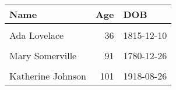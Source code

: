 \begin{table}[H]
\centering
\begin{tabular}{lrl}
\toprule
Name & Age & DOB\\
\midrule
\cellcolor{gray!6}{Charles Babbage} & \cellcolor{gray!6}{79} & \cellcolor{gray!6}{1791-12-26}\\
Ada Lovelace & 36 & 1815-12-10\\
\cellcolor{gray!6}{Alan Turing} & \cellcolor{gray!6}{41} & \cellcolor{gray!6}{1912-06-23}\\
Mary Somerville & 91 & 1780-12-26\\
\cellcolor{gray!6}{John Conway} & \cellcolor{gray!6}{82} & \cellcolor{gray!6}{1937-12-26}\\
\addlinespace
Katherine Johnson & 101 & 1918-08-26\\
\bottomrule
\end{tabular}
\end{table}